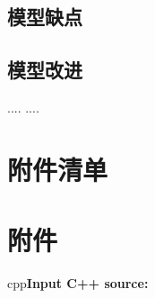 \documentclass[withoutpreface,bwprint]{cumcmthesis} %
\begin{document}
\subsection{模型缺点}
\subsection{模型改进}



\begin{thebibliography}{9}
  ....
  ....
\end{thebibliography}

\section{附件清单}
\section{附件}
cpp\textcolor[rgb]{0.98,0.00,0.00}{\textbf{Input C++ source:}}

\end{document}
